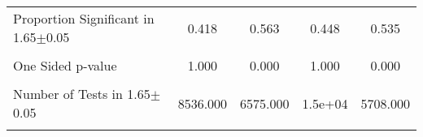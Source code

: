 {\begin{tabular}{l*{4}{c}}
                &                  &                  &                  &                  \\
\hline Proportion Significant in 1.65$\pm$0.05&    0.418         &    0.563         &    0.448         &    0.535         \\
                &                  &                  &                  &                  \\
One Sided p-value&    1.000         &    0.000         &    1.000         &    0.000         \\
                &                  &                  &                  &                  \\
Number of Tests in 1.65$\pm$0.05& 8536.000         & 6575.000         &  1.5e+04         & 5708.000         \\
                &                  &                  &                  &                  \\
\hline\hline
\end{tabular}
}
